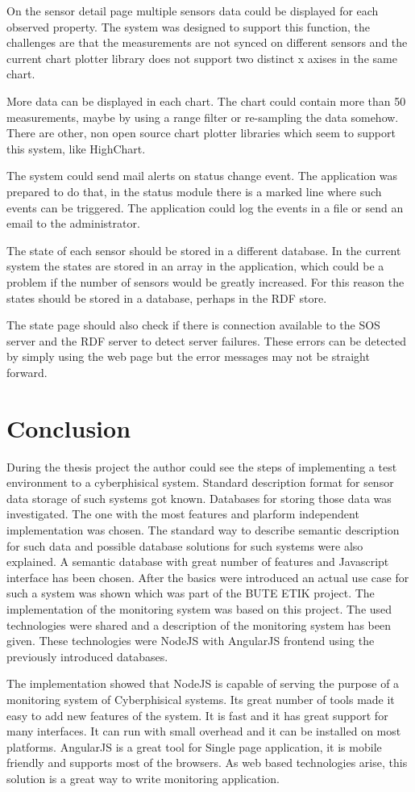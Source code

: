 On the sensor detail page multiple sensors data could be displayed for each observed property. The system was designed to support this function, the challenges are that the measurements are not synced on different sensors and the current chart plotter library does not support two distinct x axises in the same chart. 

More data can be displayed in each chart. The chart could contain more than 50 measurements, maybe by using a range filter or re-sampling the data somehow. There are other, non open source chart plotter libraries which seem to support this system, like HighChart.

The system could send mail alerts on status change event. The application was prepared to do that, in the status module there is a marked line where such events can be triggered. The application could log the events in a file or send an email to the administrator.

The state of each sensor should be stored in a different database. In the current system the states are stored in an array in the application, which could be a problem if the number of sensors would be greatly increased. For this reason the states should be stored in a database, perhaps in the RDF store.

The state page should also check if there is connection available to the SOS server and the RDF server to detect server failures. These errors can be detected by simply using the web page but the error messages may not be straight forward.

\section{Conclusion}
During the thesis project the author could see the steps of implementing a test environment to a cyberphisical system. Standard description format for sensor data storage of such systems got known. Databases for storing those data was investigated. The one with the most features and plarform independent implementation was chosen. The standard way to describe semantic description for such data and possible database solutions for such systems were also explained. A semantic database with great number of features and Javascript interface has been chosen. After the basics were introduced an actual use case for such a system was shown which was part of the BUTE ETIK project. The implementation of the monitoring system was based on this project. The used technologies were shared and a description of the monitoring system has been given. These technologies were NodeJS with AngularJS frontend using the previously introduced databases. 

The implementation showed that NodeJS is capable of serving the purpose of a monitoring system of Cyberphisical systems. Its great number of tools made it easy to add new features of the system. It is fast and it has great support for many interfaces. It can run with small overhead and it can be installed on most platforms. AngularJS is a great tool for Single page application, it is mobile friendly and supports most of the browsers. As web based technologies arise, this solution is a great way to write monitoring application. 

